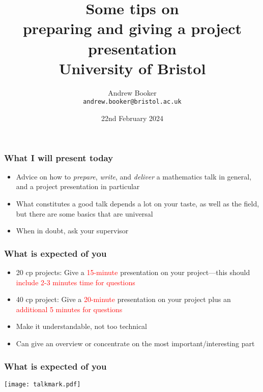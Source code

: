\documentclass[t]{beamer} %
\title{Some tips on \\ preparing and giving a project presentation\\
{\small University of Bristol}}
\author{Andrew Booker\\ \texttt{andrew.booker@bristol.ac.uk}}
\date{22nd February 2024}
\begin{document}
\begin{frame}
\titlepage
\end{frame}

\begin{frame}
\frametitle{What I will present today}
\begin{itemize}
\item Advice on how to \emph{prepare}, \emph{write}, and \emph{deliver} a mathematics talk in general, and a project presentation in particular 
\item What constitutes a good talk depends a lot on your taste, as well
as the field, but there are some basics that are universal
\item When in doubt, ask your supervisor
\end{itemize}
\end{frame}

\begin{frame}
\frametitle{What is expected of you}
\begin{itemize}
\item 20 cp projects: Give a {\textcolor{red}{15-minute}}  presentation on your project---this should {\textcolor{red}{include 2-3 minutes time for questions}}
\item 40 cp project: Give a {\textcolor{red}{20-minute}} presentation on your project plus an {\textcolor{red}{additional 5 minutes for questions}}
\pause
\item Make it understandable, not too technical
\item Can give an overview or concentrate on the most important/interesting part
\end{itemize}
\end{frame}

\begin{frame}
\frametitle{What is expected of you}
\texttt{[image: talkmark.pdf]}
\end{frame}
\end{document}
